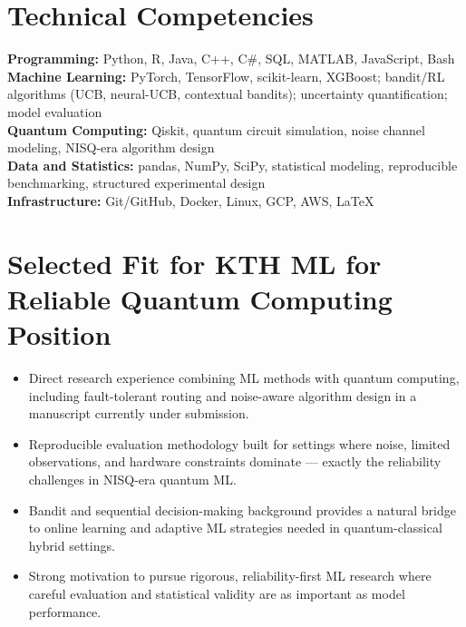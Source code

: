 \documentclass[11pt]{article}
\begin{document}
\section{Technical Competencies}
\textbf{Programming:} Python, R, Java, C++, C\#, SQL, MATLAB, JavaScript, Bash\\
\textbf{Machine Learning:} PyTorch, TensorFlow, scikit-learn, XGBoost; bandit/RL algorithms (UCB, neural-UCB, contextual bandits); uncertainty quantification; model evaluation\\
\textbf{Quantum Computing:} Qiskit, quantum circuit simulation, noise channel modeling, NISQ-era algorithm design\\
\textbf{Data and Statistics:} pandas, NumPy, SciPy, statistical modeling, reproducible benchmarking, structured experimental design\\
\textbf{Infrastructure:} Git/GitHub, Docker, Linux, GCP, AWS, LaTeX

\section{Selected Fit for KTH ML for Reliable Quantum Computing Position}
\begin{itemize}
  \item Direct research experience combining ML methods with quantum computing, including fault-tolerant routing and noise-aware algorithm design in a manuscript currently under submission.
  \item Reproducible evaluation methodology built for settings where noise, limited observations, and hardware constraints dominate --- exactly the reliability challenges in NISQ-era quantum ML.
  \item Bandit and sequential decision-making background provides a natural bridge to online learning and adaptive ML strategies needed in quantum-classical hybrid settings.
  \item Strong motivation to pursue rigorous, reliability-first ML research where careful evaluation and statistical validity are as important as model performance.
\end{itemize}
\end{document}
